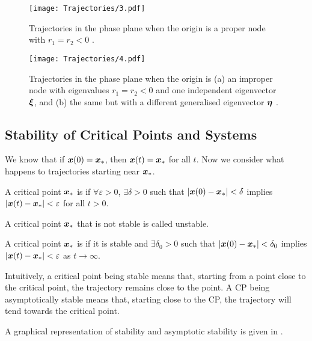 \begin{figure}[H]
	\centering
	\texttt{[image: Trajectories/3.pdf]}
	\caption{Trajectories in the phase plane when the origin is a proper node with $r_1 = r_2 < 0$ \cite[Figure 9.1.3(a)]{boyce}.}
	\label{fig:trajectory3}
\end{figure}

\begin{figure}[H]
	\centering
	\texttt{[image: Trajectories/4.pdf]}
	\caption{Trajectories in the phase plane when the origin is (a) an improper node with eigenvalues $r_1 = r_2 < 0$ and one independent eigenvector $\bm{\xi}$, and (b) the same but with a different generalised eigenvector $\bm{\eta}$ \cite[Figure 9.1.4]{boyce}.}
	\label{fig:trajectory4}
\end{figure}

\subsection{Stability of Critical Points and Systems}

We know that if $\bm{x}(0) = \bm{x}_{\ast}$, then $\bm{x}(t) = \bm{x}_{\ast}$ for all $t$. Now we consider what happens to trajectories starting near $\bm{x}_{\ast}$.

\begin{definition}
	A critical point $\bm{x}_{\ast}$ is  if $\forall \varepsilon>0$, $\exists \delta>0$ such that $|\bm{x}(0) - \bm{x}_{\ast}| < \delta$ implies $|\bm{x}(t) - \bm{x}_{\ast}|<\varepsilon$ for all $t>0$.
\end{definition}

\begin{definition}
	A critical point $\bm{x}_{\ast}$ that is not stable is called unstable.
\end{definition}

\begin{definition}
	A critical point $\bm{x}_{\ast}$ is  if it is stable and $\exists \delta_0 >0$ such that $|\bm{x}(0) - \bm{x}_{\ast}| < \delta_0$ implies $|\bm{x}(t) - \bm{x}_{\ast}|<\varepsilon$ as $t \to \infty$.
\end{definition}

Intuitively, a critical point being stable means that, starting from a point close to the critical point, the trajectory remains close to the point. A CP being asymptotically stable means that, starting close to the CP, the trajectory will tend towards the critical point.

A graphical representation of stability and asymptotic stability is given in .

